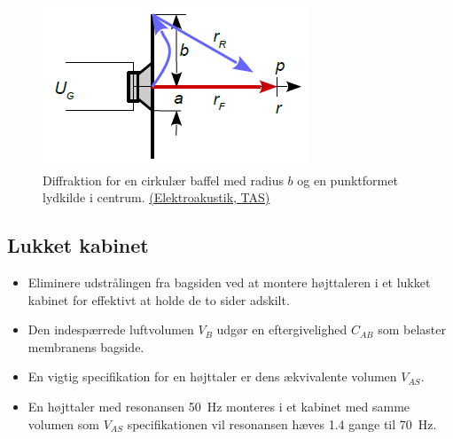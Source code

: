 \begin{figure} [H]
	\centering
	\includegraphics[width=0.5\linewidth]{graphics/55.png}
	\caption{Diffraktion for en cirkulær baffel med radius $b$ og en punktformet lydkilde i centrum. \href{http://www.torean.dk/artikel/Elektroakustik.pdf}{(Elektroakustik, TAS)}}
	\label{fig:55}
\end{figure}

\subsection{Lukket kabinet}
\begin{itemize}
	\item Eliminere udstrålingen fra bagsiden ved at montere højttaleren i et lukket kabinet for effektivt at holde de to sider adskilt.
	\item Den indespærrede luftvolumen $V_B$ udgør en eftergivelighed $C_{AB}$ som	belaster membranens bagside.
	\item En vigtig specifikation for en højttaler er dens ækvivalente volumen $V_{AS}$.
	\item En højttaler med resonansen \SI{50}{\hertz} monteres i et kabinet med samme volumen som $V_{AS}$ specifikationen vil resonansen hæves 1.4
	gange til \SI{70}{\hertz}.
\end{itemize}

